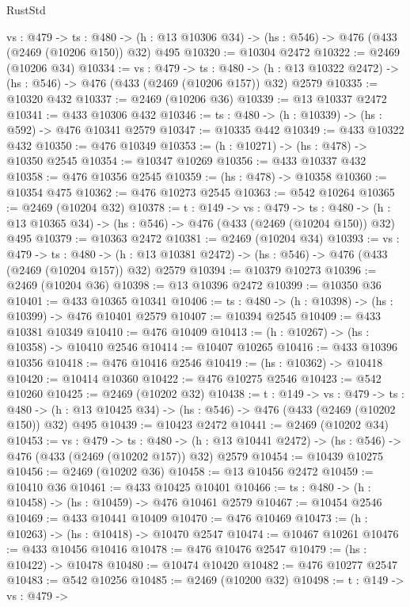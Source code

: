 \begin{lexlean}{RustStd}
\begin{coremodule}
  {vs : @479} ->
  {ts : @480} -> (h : @13 @10306 @34) -> (hs : @546) -> @476 (@433 (@2469 (@10206 @150)) @32) @495
@10320 := @10304 @2472
@10322 := @2469 (@10206 @34)
@10334 := {vs : @479} ->
  {ts : @480} ->
  (h : @13 @10322 @2472) -> (hs : @546) -> @476 (@433 (@2469 (@10206 @157)) @32) @2579
@10335 := @10320 @432
@10337 := @2469 (@10206 @36)
@10339 := @13 @10337 @2472
@10341 := @433 @10306 @432
@10346 := {ts : @480} -> (h : @10339) -> (hs : @592) -> @476 @10341 @2579
@10347 := @10335 @442
@10349 := @433 @10322 @432
@10350 := @476 @10349
@10353 := (h : @10271) -> (hs : @478) -> @10350 @2545
@10354 := @10347 @10269
@10356 := @433 @10337 @432
@10358 := @476 @10356 @2545
@10359 := (hs : @478) -> @10358
@10360 := @10354 @475
@10362 := @476 @10273 @2545
@10363 := @542 @10264
@10365 := @2469 (@10204 @32)
@10378 := {t : @149} ->
  {vs : @479} ->
  {ts : @480} -> (h : @13 @10365 @34) -> (hs : @546) -> @476 (@433 (@2469 (@10204 @150)) @32) @495
@10379 := @10363 @2472
@10381 := @2469 (@10204 @34)
@10393 := {vs : @479} ->
  {ts : @480} ->
  (h : @13 @10381 @2472) -> (hs : @546) -> @476 (@433 (@2469 (@10204 @157)) @32) @2579
@10394 := @10379 @10273
@10396 := @2469 (@10204 @36)
@10398 := @13 @10396 @2472
@10399 := @10350 @36
@10401 := @433 @10365 @10341
@10406 := {ts : @480} -> (h : @10398) -> (hs : @10399) -> @476 @10401 @2579
@10407 := @10394 @2545
@10409 := @433 @10381 @10349
@10410 := @476 @10409
@10413 := (h : @10267) -> (hs : @10358) -> @10410 @2546
@10414 := @10407 @10265
@10416 := @433 @10396 @10356
@10418 := @476 @10416 @2546
@10419 := (hs : @10362) -> @10418
@10420 := @10414 @10360
@10422 := @476 @10275 @2546
@10423 := @542 @10260
@10425 := @2469 (@10202 @32)
@10438 := {t : @149} ->
  {vs : @479} ->
  {ts : @480} -> (h : @13 @10425 @34) -> (hs : @546) -> @476 (@433 (@2469 (@10202 @150)) @32) @495
@10439 := @10423 @2472
@10441 := @2469 (@10202 @34)
@10453 := {vs : @479} ->
  {ts : @480} ->
  (h : @13 @10441 @2472) -> (hs : @546) -> @476 (@433 (@2469 (@10202 @157)) @32) @2579
@10454 := @10439 @10275
@10456 := @2469 (@10202 @36)
@10458 := @13 @10456 @2472
@10459 := @10410 @36
@10461 := @433 @10425 @10401
@10466 := {ts : @480} -> (h : @10458) -> (hs : @10459) -> @476 @10461 @2579
@10467 := @10454 @2546
@10469 := @433 @10441 @10409
@10470 := @476 @10469
@10473 := (h : @10263) -> (hs : @10418) -> @10470 @2547
@10474 := @10467 @10261
@10476 := @433 @10456 @10416
@10478 := @476 @10476 @2547
@10479 := (hs : @10422) -> @10478
@10480 := @10474 @10420
@10482 := @476 @10277 @2547
@10483 := @542 @10256
@10485 := @2469 (@10200 @32)
@10498 := {t : @149} ->
  {vs : @479} ->

\end{coremodule}
\end{lexlean}
